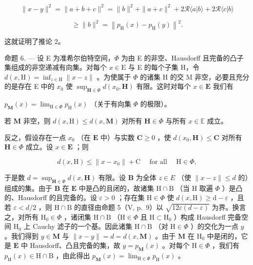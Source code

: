 \[
\| x - y \| ^ {2} = \| a + b + c \| ^ {2} = \| b \| ^ {2} + \| a + c \| ^ {2} + 2 \mathscr {R} \langle a | b \rangle + 2 \mathscr {R} \langle c | b \rangle
\]

\[
\geqslant \| b \| ^ {2} = \left\| p _ {\mathrm{H}} (x) - p _ {\mathrm{H}} (y) \right\| ^ {2}.
\]

这就证明了推论 2。

命题 6. --- 设 E 为准希尔伯特空间，\(\Phi\) 为由 E 的非空、Hausdorff 且完备的凸子集组成的非空递减有向集。对每个 \(x \in \mathrm{E}\) 与 E 的每个子集 H，令 \(d(x, \mathrm{H}) = \inf_{z \in \mathrm{H}} \| x - z \|\) 。为使属于 \(\Phi\) 的诸集 H 的交 M 非空，必要且充分的是存在 E 中的 \(x_0\) 使 \(\sup_{\mathbf{H} \in \Phi} d(x_0, \mathbf{H})\) 有限。这时对每个 \(x \in \mathbf{E}\) 我们有

\(p_{\mathbf{M}}(x) = \lim_{\mathrm{H}\in \Phi}p_{\mathrm{H}}(x)\) （关于有向集 \(\Phi\) 的极限）。

若 \(\mathbf{M}\) 非空，则 \(d(x,\mathrm{H})\leqslant d(x,\mathbf{M})\) 对所有 \(\mathbf{H}\in \Phi\) 与所有 \(x\in \mathbb{E}\) 成立。

反之，假设存在一点 \(x_0\) （在 \(\mathbf{E}\) 中）与实数 \(\mathbf{C} \geqslant 0\) ，使 \(d(x_0, \mathbf{H}) \leqslant \mathbf{C}\) 对所有 \(\mathbf{H} \in \Phi\) 成立。设 \(x \in \mathbf{E}\) ；则

\[
d (x, \mathrm{H}) \leqslant \| x - x _ {0} \| + \mathrm{C} \quad \text { for   all } \quad \mathrm{H} \in \Phi ,
\]

于是数 \(d = \sup_{\mathbf{H} \in \Phi} d(x, \mathbf{H})\) 有限。设 \(\mathbf{B}\) 为全体 \(z \in E\) （使 \(\| x - z\| \leqslant d\) 的）组成的集。由于 \(\mathbf{B}\) 在 \(\mathbf{E}\) 中是凸的且闭的，故诸集 \(\mathrm{H} \cap \mathrm{B}\) （当 \(\mathrm{H}\) 取遍 \(\Phi\) ）是凸的、Hausdorff 的且完备的。设 \(\varepsilon > 0\) ；存在集 \(\mathrm{H} \in \Phi\) 使 \(d(x, \mathrm{H}) \geqslant \mathrm{d} - \varepsilon\) ，且若 \(\varepsilon < d/2\) ，则 \(\mathrm{H} \cap \mathrm{B}\) 的直径由命题 5（V, p.~9）以 \(\sqrt{12\varepsilon(d - \varepsilon)}\) 为界。换言之，对所有 \(\mathrm{H}_0 \in \Phi\) ，诸闭集 \(\mathrm{H} \cap \mathrm{B}\) （\(\mathrm{H} \in \Phi\) 且 \(\mathrm{H} \subset \mathrm{H}_0\) ）构成 Hausdorff 完备空间 \(\mathrm{H}_0\) 上 Cauchy 滤子的一个基。因此诸集 \(\mathrm{H} \cap \mathrm{B}\) （对 \(\mathrm{H} \in \Phi\) ）的交化为一点 \(y\) 。我们得到 \(y \in \mathbf{M}\) 与 \(\| x - y \| = d = d(x, \mathbf{M})\) 。由于 \(\mathbf{M}\) 在 \(\mathrm{H}_0\) 中是闭的，它是 \(\mathbf{E}\) 中 Hausdorff、凸且完备的集，故 \(y = p_{\mathbf{M}}(x)\) 。对每个 \(\mathrm{H} \in \Phi\) ，我们有 \(p_{\mathrm{H}}(x) \in \mathrm{H} \cap \mathrm{B}\) ，由此得出 \(p_{\mathbf{M}}(x) = \lim_{\mathrm{H} \in \Phi} p_{\mathrm{H}}(x)\) 。


